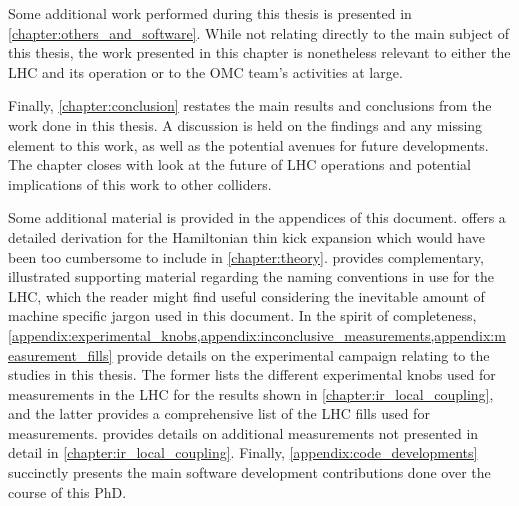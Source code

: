 Some additional work performed during this thesis is presented in \cref{chapter:others_and_software}.
While not relating directly to the main subject of this thesis, the work presented in this chapter is nonetheless relevant to either the \gls{LHC} and its operation or to the \gls{OMC} team's activities at large.

Finally, \cref{chapter:conclusion} restates the main results and conclusions from the work done in this thesis.
A discussion is held on the findings and any missing element to this work, as well as the potential avenues for future developments.
The chapter closes with look at the future of LHC operations and potential implications of this work to other colliders.

Some additional material is provided in the appendices of this document.
 offers a detailed derivation for the Hamiltonian thin kick expansion which would have been too cumbersome to include in \cref{chapter:theory}.
 provides complementary, illustrated supporting material regarding the naming conventions in use for the \gls{LHC}, which the reader might find useful considering the inevitable amount of machine specific jargon used in this document.
In the spirit of completeness, \cref{appendix:experimental_knobs,appendix:inconclusive_measurements,appendix:measurement_fills} provide details on the experimental campaign relating to the studies in this thesis.
The former lists the different experimental knobs used for measurements in the LHC for the results shown in \cref{chapter:ir_local_coupling}, and the latter provides a comprehensive list of the LHC fills used for measurements.
 provides details on additional measurements not presented in detail in \cref{chapter:ir_local_coupling}.
Finally, \cref{appendix:code_developments} succinctly presents the main software development contributions done over the course of this PhD.

\glsresetall                                     %
